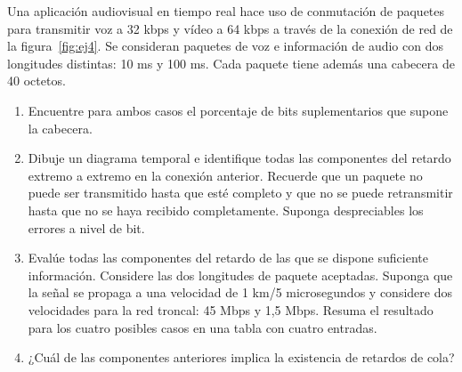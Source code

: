 \begin{ejercicio}
    Una aplicación audiovisual en tiempo real hace uso de conmutación de paquetes para transmitir voz a 32 kbps y vídeo a 64 kbps a través de la conexión de red de la figura~\ref{fig:ej4}.  Se consideran paquetes de voz e información de audio con dos longitudes distintas: 10 ms y 100 ms. Cada paquete tiene además una cabecera de 40 octetos.
    \begin{enumerate}[label=\alph*.]
        \item Encuentre para ambos casos el porcentaje de bits suplementarios que supone la cabecera.
        \item Dibuje un diagrama temporal e identifique todas las componentes del retardo extremo a extremo en la conexión anterior. Recuerde que un paquete no puede ser transmitido hasta que esté completo y que no se puede retransmitir hasta que no se haya recibido completamente. Suponga despreciables los errores a nivel de bit.
        \item Evalúe todas las componentes del retardo de las que se dispone suficiente información. Considere las dos longitudes de paquete aceptadas. Suponga que la señal se propaga a una velocidad de 1 km/5 microsegundos y considere dos velocidades para la red troncal: 45 Mbps y 1,5 Mbps. Resuma el resultado para los cuatro posibles casos en una tabla con cuatro entradas.
        \item ¿Cuál de las componentes anteriores implica la existencia de retardos de cola?
    \end{enumerate}

\end{ejercicio}

